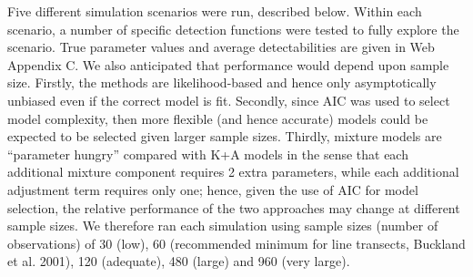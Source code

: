 \documentclass[useAMS,referee]{biom}
\begin{document}
Five different simulation scenarios were run, described below.  Within each scenario, a number of specific detection functions were tested to fully explore the scenario.  True parameter values and average detectabilities are given in Web Appendix C.  We also anticipated that performance would depend upon sample size. Firstly, the methods are likelihood-based and hence only asymptotically unbiased even if the correct model is fit. Secondly, since AIC was used to select model complexity, then more flexible (and hence accurate) models could be expected to be selected given larger sample sizes.  Thirdly, mixture models are ``parameter hungry'' compared with K+A models in the sense that each additional mixture component requires 2 extra parameters, while each additional adjustment term requires only one; hence, given the use of AIC for model selection, the relative performance of the two approaches may change at different sample sizes.  We therefore ran each simulation using sample sizes (number of observations) of 30 (low), 60 (recommended minimum for line transects, Buckland et al. 2001), 120 (adequate), 480 (large) and 960 (very large).
\end{document}
